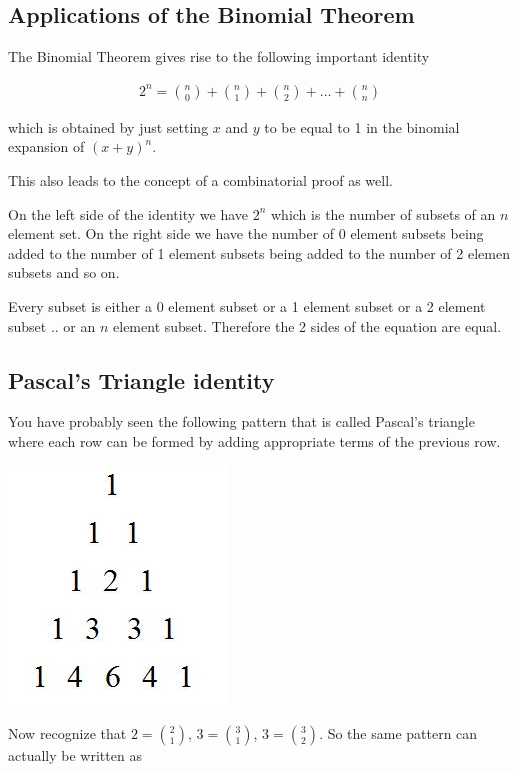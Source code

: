 \documentclass[12pt]{article}
\begin{document}
\subsection*{Applications of the Binomial Theorem}

The Binomial Theorem gives rise to the following important identity

\begin{align*}
2^n = \binom{n}{0} + \binom{n}{1} + \binom{n}{2} + \ldots + \binom{n}{n}
\end{align*}

which is obtained by just setting $x$ and $y$ to be equal to 1 in the binomial expansion of $(x+y)^n$.

This also leads to the concept of a combinatorial proof as well.

On the left side of the identity we have $2^n$ which is the number of subsets of an $n$ element set. On the right side we have the number of 0 element subsets being added to the number of 1 element subsets being added to the number of 2 elemen subsets and so on.

Every subset is either a 0 element subset or a 1 element subset or a 2 element subset .. or an $n$ element subset. Therefore the 2 sides of the equation are equal.

\subsection*{Pascal's Triangle identity}

You have probably seen the following pattern that is called Pascal's triangle where each row can be formed by adding appropriate terms of the previous row.

\includegraphics[scale=0.6]{pascal.png}

Now recognize that $2 = {2 \choose 1}$,  $3 = {3 \choose 1}$, $3 = {3 \choose 2}$. So the same pattern can actually be written as
\end{document}
